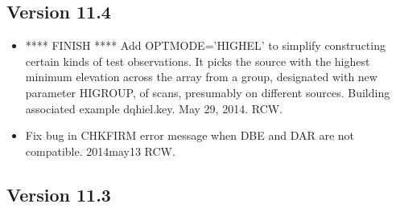 \documentclass{report}
\begin{document}


\subsection{\label{SSEC:VER_11.3}Version 11.4}

\begin{itemize}

\item ****  FINISH  **** Add OPTMODE='HIGHEL' to simplify constructing certain kinds of
test observations.  It picks the source with the highest minimum elevation
across the array from a group, designated with new parameter HIGROUP,
of scans, presumably on different sources.  Building associated
example dqhiel.key.  May 29, 2014.  RCW.

\item Fix bug in CHKFIRM error message when DBE and DAR are not compatible.
2014may13  RCW.

\end{itemize}

\subsection{\label{SSEC:VER_11.3}Version 11.3}
\end{document}
